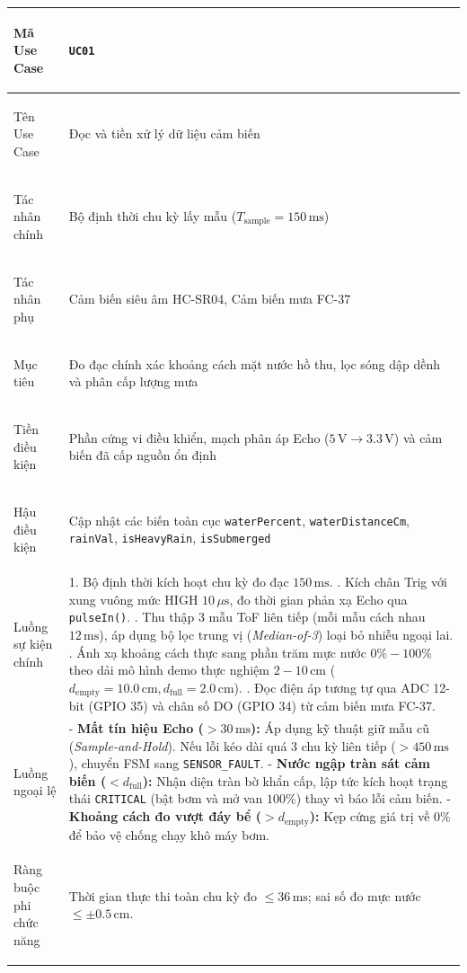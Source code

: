 \begin{xltabular}{\textwidth}{|>{\bfseries\raggedright\arraybackslash}p{3.2cm}|X|}
Mã Use Case & \texttt{UC01} \\ \hline
Tên Use Case & Đọc và tiền xử lý dữ liệu cảm biến \\ \hline
Tác nhân chính & Bộ định thời chu kỳ lấy mẫu ($T_{\text{sample}} = 150\,\text{ms}$) \\ \hline
Tác nhân phụ & Cảm biến siêu âm HC-SR04, Cảm biến mưa FC-37 \\ \hline
Mục tiêu & Đo đạc chính xác khoảng cách mặt nước hồ thu, lọc sóng dập dềnh và phân cấp lượng mưa \\ \hline
Tiền điều kiện & Phần cứng vi điều khiển, mạch phân áp Echo ($5\,\text{V} \to 3.3\,\text{V}$) và cảm biến đã cấp nguồn ổn định \\ \hline
Hậu điều kiện & Cập nhật các biến toàn cục \texttt{waterPercent}, \texttt{waterDistanceCm}, \texttt{rainVal}, \texttt{isHeavyRain}, \texttt{isSubmerged} \\ \hline
Luồng sự kiện chính & 
1. Bộ định thời kích hoạt chu kỳ đo đạc $150\,\text{ms}$. . Kích chân Trig với xung vuông mức HIGH $10\,\mu\text{s}$, đo thời gian phản xạ Echo qua \texttt{pulseIn()}. . Thu thập 3 mẫu ToF liên tiếp (mỗi mẫu cách nhau $12\,\text{ms}$), áp dụng bộ lọc trung vị (\textit{Median-of-3}) loại bỏ nhiễu ngoại lai. . Ánh xạ khoảng cách thực sang phần trăm mực nước $0\% - 100\%$ theo dải mô hình demo thực nghiệm $2 - 10\,\text{cm}$ ($d_{\text{empty}} = 10.0\,\text{cm}, d_{\text{full}} = 2.0\,\text{cm}$). . Đọc điện áp tương tự qua ADC 12-bit (GPIO 35) và chân số DO (GPIO 34) từ cảm biến mưa FC-37. \\ \hline
Luồng ngoại lệ & 
- \textbf{Mất tín hiệu Echo ($> 30\,\text{ms}$):} Áp dụng kỹ thuật giữ mẫu cũ (\textit{Sample-and-Hold}). Nếu lỗi kéo dài quá 3 chu kỳ liên tiếp ($> 450\,\text{ms}$), chuyển FSM sang \texttt{SENSOR\_FAULT}. \newline
- \textbf{Nước ngập tràn sát cảm biến ($< d_{\text{full}}$):} Nhận diện tràn bờ khẩn cấp, lập tức kích hoạt trạng thái \texttt{CRITICAL} (bật bơm và mở van $100\%$) thay vì báo lỗi cảm biến. \newline
- \textbf{Khoảng cách đo vượt đáy bể ($> d_{\text{empty}}$):} Kẹp cứng giá trị về $0\%$ để bảo vệ chống chạy khô máy bơm. \\ \hline
Ràng buộc phi chức năng & Thời gian thực thi toàn chu kỳ đo $\le 36\,\text{ms}$; sai số đo mực nước $\le \pm 0.5\,\text{cm}$. \\ \hline
\end{xltabular}
\endgroup

